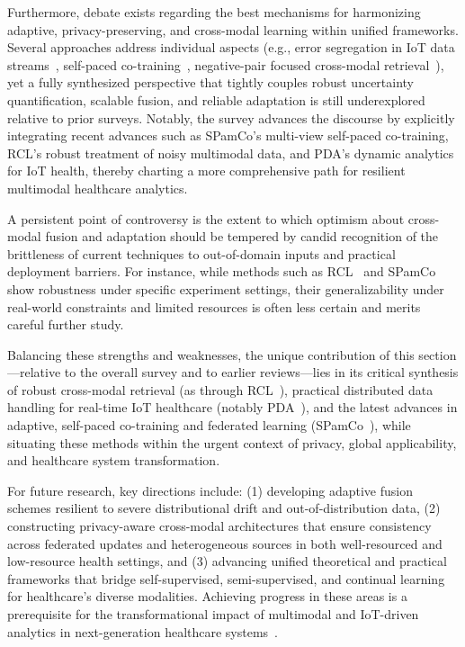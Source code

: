 \documentclass[sigconf]{acmart}
\begin{document}
Furthermore, debate exists regarding the best mechanisms for harmonizing adaptive, privacy-preserving, and cross-modal learning within unified frameworks. Several approaches address individual aspects (e.g., error segregation in IoT data streams~\cite{ref106}, self-paced co-training~\cite{ref105}, negative-pair focused cross-modal retrieval~\cite{ref104}), yet a fully synthesized perspective that tightly couples robust uncertainty quantification, scalable fusion, and reliable adaptation is still underexplored relative to prior surveys. Notably, the survey advances the discourse by explicitly integrating recent advances such as SPamCo's multi-view self-paced co-training, RCL's robust treatment of noisy multimodal data, and PDA's dynamic analytics for IoT health, thereby charting a more comprehensive path for resilient multimodal healthcare analytics.

A persistent point of controversy is the extent to which optimism about cross-modal fusion and adaptation should be tempered by candid recognition of the brittleness of current techniques to out-of-domain inputs and practical deployment barriers. For instance, while methods such as RCL~\cite{ref104} and SPamCo~\cite{ref105} show robustness under specific experiment settings, their generalizability under real-world constraints and limited resources is often less certain and merits careful further study.

Balancing these strengths and weaknesses, the unique contribution of this section—relative to the overall survey and to earlier reviews—lies in its critical synthesis of robust cross-modal retrieval (as through RCL~\cite{ref104}), practical distributed data handling for real-time IoT healthcare (notably PDA~\cite{ref106}), and the latest advances in adaptive, self-paced co-training and federated learning (SPamCo~\cite{ref105}), while situating these methods within the urgent context of privacy, global applicability, and healthcare system transformation.

For future research, key directions include: (1) developing adaptive fusion schemes resilient to severe distributional drift and out-of-distribution data, (2) constructing privacy-aware cross-modal architectures that ensure consistency across federated updates and heterogeneous sources in both well-resourced and low-resource health settings, and (3) advancing unified theoretical and practical frameworks that bridge self-supervised, semi-supervised, and continual learning for healthcare’s diverse modalities. Achieving progress in these areas is a prerequisite for the transformational impact of multimodal and IoT-driven analytics in next-generation healthcare systems~\cite{ref104,ref105,ref106,ref107}.
\end{document}
